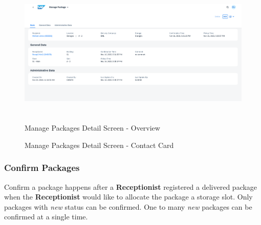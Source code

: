 \begin{figure}[H]
	\centering
	\includegraphics[height=200pt]{images/user_doc/managePack/DetailScreen/browse/overview.png}
	\caption{Manage Packages Detail Screen - Overview}
	\label{fig:MPdetailOverview}
\end{figure}

\begin{figure}[H]
	\centering
	\hspace{5pt}
    \caption{Manage Packages Detail Screen - Contact Card}
	\label{fig:MPObjectContactCard}
\end{figure}

\subsubsection{Confirm Packages}

Confirm a package happens after a \textbf{Receptionist} registered a delivered package when the \textbf{Receptionist} would like to allocate the package a storage slot. Only packages with \textit{new} status can be confirmed. One to many \textit{new} packages can be confirmed at a single time.

